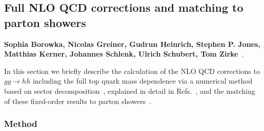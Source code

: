 \subsection{Full NLO QCD corrections and matching to parton showers}
\label{sec:fullPS}


\textbf{Sophia Borowka, Nicolas Greiner, Gudrun Heinrich, Stephen P. Jones, Matthias Kerner, Johannes Schlenk, Ulrich Schubert, Tom Zirke}~\cite{Borowka:2016ehy,Borowka:2016ypz,Heinrich:2017kxx,Jones:2017giv,Heinrich:2019bkc}.

\noindent In this section we briefly describe the calculation of the NLO QCD corrections to $gg\to hh$ including the full top quark mass dependence via a numerical method based on sector decomposition~\cite{Binoth:2000ps,Borowka:2015mxa}, explained in detail in Refs.~\cite{Borowka:2016ehy,Borowka:2016ypz}, and the matching of these fixed-order results to parton showers~\cite{Heinrich:2017kxx,Jones:2017giv,Heinrich:2019bkc}.

\subsubsection{Method}
\label{intro_ampli}

